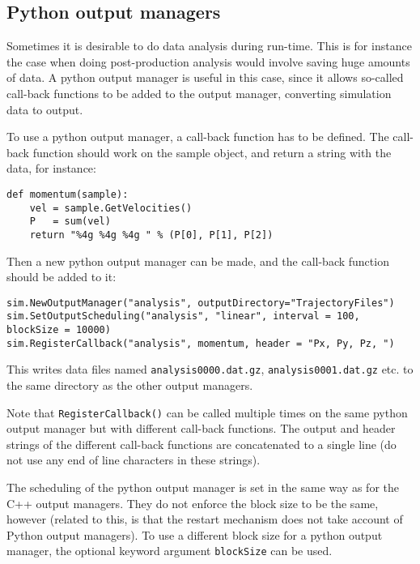 \documentclass[a4paper]{article}
\begin{document}
\subsection{Python output managers}

Sometimes it is desirable to do data analysis during run-time. This is  for 
instance the case when doing post-production analysis would involve saving huge
 amounts of data. A python output manager is useful in this case, since it 
allows so-called call-back functions to be added to the output manager, 
converting simulation data to output.

To use a python output manager, a call-back function has to be defined. The 
call-back function should work on the sample object, and return a string with 
the data, for instance:
\begin{verbatim}
def momentum(sample):
    vel = sample.GetVelocities()
    P   = sum(vel)
    return "%4g %4g %4g " % (P[0], P[1], P[2])
\end{verbatim}
Then a new python output manager can be made, and the call-back function should 
be added to it:
\begin{verbatim}
sim.NewOutputManager("analysis", outputDirectory="TrajectoryFiles")
sim.SetOutputScheduling("analysis", "linear", interval = 100, blockSize = 10000)
sim.RegisterCallback("analysis", momentum, header = "Px, Py, Pz, ")
\end{verbatim}
This writes data files named \verb|analysis0000.dat.gz|, \verb|analysis0001.dat.gz| etc. to the same directory as the other output managers.

Note that \verb|RegisterCallback()| can be called multiple times on the same 
python output manager but with different call-back functions. The output and 
header strings of the different call-back functions are concatenated to a single
 line (do not use any end of line characters in these strings). 

The scheduling of the python output manager is set in the same way as for the 
C++ output managers. They do not enforce the block size to be the same, however
 (related to this, is that the
restart mechanism does not take account of Python output managers). To use a 
different block size for a python output manager, the optional keyword argument
\verb|blockSize| can be used.
\end{document}

